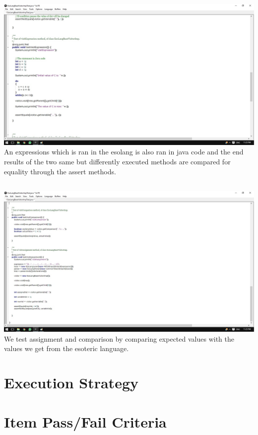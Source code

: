 \documentclass[english]{article}
\begin{document}
			\subsection{}			
			\includegraphics[width=\linewidth]{test3.jpg}
			\\[12pt]		
			An expressions which is ran in the esolang is also ran in java code and the end results of the two same but differently executed methods are compared for equality through the assert methods. 	
			\subsection{}
			\includegraphics[width=\linewidth]{test4.jpg}
			\\[12pt]
			We test assignment and comparison by comparing expected values with the values we get from the esoteric language.	
	
	\section{Execution Strategy}
	\section{Item Pass/Fail Criteria}
\end{document}

